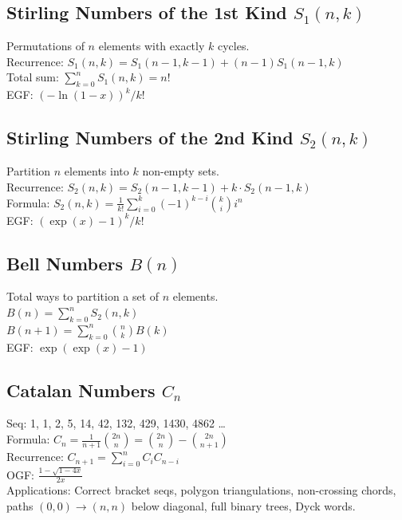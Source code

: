 \subsection{Stirling Numbers of the 1st Kind $S_1(n,k)$}
Permutations of $n$ elements with exactly $k$ cycles. \\
\textbullet{} Recurrence: $S_1(n,k) = S_1(n-1,k-1) + (n-1)S_1(n-1,k)$ \\
\textbullet{} Total sum: $\sum_{k=0}^n S_1(n,k) = n!$ \\
\textbullet{} EGF: $(-\ln(1-x))^k / k!$

\subsection{Stirling Numbers of the 2nd Kind $S_2(n,k)$}
Partition $n$ elements into $k$ non-empty sets. \\
\textbullet{} Recurrence: $S_2(n,k) = S_2(n-1,k-1) + k \cdot S_2(n-1,k)$ \\
\textbullet{} Formula: $S_2(n,k) = \frac{1}{k!} \sum_{i=0}^k (-1)^{k-i} \binom{k}{i} i^n$ \\
\textbullet{} EGF: $(\exp(x)-1)^k / k!$

\subsection{Bell Numbers $B(n)$}
Total ways to partition a set of $n$ elements. \\
\textbullet{} $B(n) = \sum_{k=0}^n S_2(n,k)$ \\
\textbullet{} $B(n+1) = \sum_{k=0}^n \binom{n}{k} B(k)$ \\
\textbullet{} EGF: $\exp(\exp(x)-1)$

\subsection{Catalan Numbers $C_n$}
Seq: 1, 1, 2, 5, 14, 42, 132, 429, 1430, 4862 \dots \\
\textbullet{} Formula: $C_n = \frac{1}{n+1} \binom{2n}{n} = \binom{2n}{n} - \binom{2n}{n+1}$ \\
\textbullet{} Recurrence: $C_{n+1} = \sum_{i=0}^n C_i C_{n-i}$ \\
\textbullet{} OGF: $\frac{1-\sqrt{1-4x}}{2x}$ \\
\textbullet{} Applications: Correct bracket seqs, polygon triangulations,
non-crossing chords, paths $(0,0) \to (n,n)$ below diagonal,
full binary trees, Dyck words.

